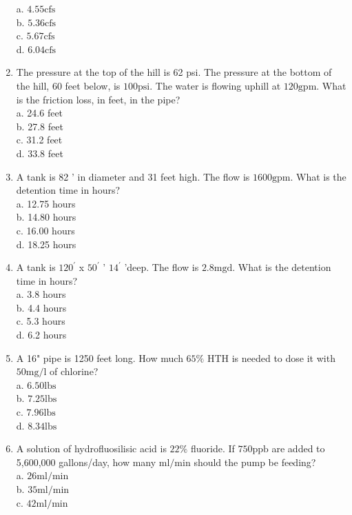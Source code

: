 \begin{enumerate}
a. $4.55 \mathrm{cfs}$\\
b. $5.36 \mathrm{cfs}$\\
c. $5.67 \mathrm{cfs}$\\
d. $6.04 \mathrm{cfs}$\\
\item The pressure at the top of the hill is 62 psi. The pressure at the bottom of the hill, 60 feet below, is $100 \mathrm{psi}$. The water is flowing uphill at $120 \mathrm{gpm}$. What is the friction loss, in feet, in the pipe?\\
a. 24.6 feet\\
b. 27.8 feet\\
c. 31.2 feet\\
d. 33.8 feet

\item A tank is 82 ' in diameter and 31 feet high. The flow is $1600 \mathrm{gpm}$. What is the detention time in hours?\\
a. 12.75 hours\\
b. 14.80 hours\\
c. 16.00 hours\\
d. 18.25 hours\\
\item A tank is $120^{\prime}$ x $50^{\prime}$ ' $14^{\prime}$ 'deep. The flow is $2.8 \mathrm{mgd}$. What is the detention time in hours?\\
a. 3.8 hours\\
b. 4.4 hours\\
c. 5.3 hours\\
d. 6.2 hours\\
\item A 16" pipe is 1250 feet long. How much $65 \%$ HTH is needed to dose it with $50 \mathrm{mg} / \mathrm{l}$ of chlorine?\\
a. $6.50 \mathrm{lbs}$\\
b. $7.25 \mathrm{lbs}$\\
c. $7.96 \mathrm{lbs}$\\
d. $8.34 \mathrm{lbs}$\\
\item A solution of hydrofluosilisic acid is $22 \%$ fluoride. If $750 \mathrm{ppb}$ are added to 5,600,000 gallons/day, how many $\mathrm{ml} / \mathrm{min}$ should the pump be feeding?\\
a. $26 \mathrm{ml} / \mathrm{min}$\\
b. $35 \mathrm{ml} / \mathrm{min}$\\
c. $42 \mathrm{ml} / \mathrm{min}$\\

\end{enumerate}
